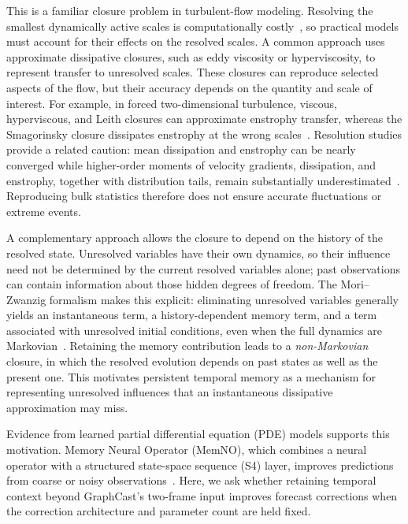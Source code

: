 \documentclass[11pt]{article}
\begin{document}
{This is a familiar closure problem in turbulent-flow modeling. Resolving the smallest dynamically active scales is computationally costly~\citep{yang2021grid}, so practical models must account for their effects on the resolved scales. A common approach uses approximate dissipative closures, such as eddy viscosity or hyperviscosity, to represent transfer to unresolved scales. These closures can reproduce selected aspects of the flow, but their accuracy depends on the quantity and scale of interest. For example, in forced two-dimensional turbulence, viscous, hyperviscous, and Leith closures can approximate enstrophy transfer, whereas the Smagorinsky closure dissipates enstrophy at the wrong scales~\citep{pietarila2013closures}. Resolution studies provide a related caution: mean dissipation and enstrophy can be nearly converged while higher-order moments of velocity gradients, dissipation, and enstrophy, together with distribution tails, remain substantially underestimated~\citep{DonzisResolutionEffects}. Reproducing bulk statistics therefore does not ensure accurate fluctuations or extreme events.}

{A complementary approach allows the closure to depend on the history of the resolved state. Unresolved variables have their own dynamics, so their influence need not be determined by the current resolved variables alone; past observations can contain information about those hidden degrees of freedom. The Mori--Zwanzig formalism makes this explicit: eliminating unresolved variables generally yields an instantaneous term, a history-dependent memory term, and a term associated with unresolved initial conditions, even when the full dynamics are Markovian~\citep{YenTingLinMZ2021,de2026data}. Retaining the memory contribution leads to a \emph{non-Markovian} closure, in which the resolved evolution depends on past states as well as the present one. This motivates persistent temporal memory as a mechanism for representing unresolved influences that an instantaneous dissipative approximation may miss.}

{Evidence from learned partial differential equation (PDE) models supports this motivation. Memory Neural Operator (MemNO), which combines a neural operator with a structured state-space sequence (S4) layer, improves predictions from coarse or noisy observations~\citep{buitrago2025memory}. Here, we ask whether retaining temporal context beyond GraphCast's two-frame input improves forecast corrections when the correction architecture and parameter count are held fixed.}
\end{document}

